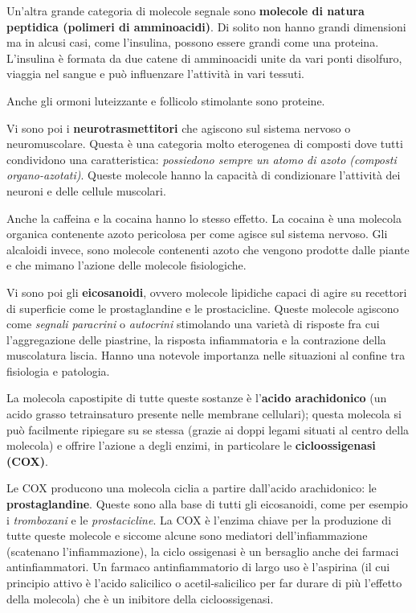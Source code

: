 \documentclass[]{article}
\begin{document}
Un'altra grande categoria di molecole segnale sono \textbf{molecole di
natura peptidica (polimeri di amminoacidi)}. Di solito non hanno grandi
dimensioni ma in alcusi casi, come l'insulina, possono essere grandi
come una proteina. L'insulina è formata da due catene di amminoacidi
unite da vari ponti disolfuro, viaggia nel sangue e può influenzare
l'attività in vari tessuti.

Anche gli ormoni luteizzante e follicolo stimolante sono proteine.

Vi sono poi i \textbf{neurotrasmettitori} che agiscono sul sistema
nervoso o neuromuscolare. Questa è una categoria molto eterogenea di
composti dove tutti condividono una caratteristica: \emph{possiedono
sempre un atomo di azoto (composti organo-azotati)}. Queste molecole
hanno la capacità di condizionare l'attività dei neuroni e delle cellule
muscolari.

Anche la caffeina e la cocaina hanno lo stesso effetto. La cocaina è una
molecola organica contenente azoto pericolosa per come agisce sul
sistema nervoso. Gli alcaloidi invece, sono molecole contenenti azoto
che vengono prodotte dalle piante e che mimano l'azione delle molecole
fisiologiche.

Vi sono poi gli \textbf{eicosanoidi}, ovvero molecole lipidiche capaci
di agire su recettori di superficie come le prostaglandine e le
prostacicline. Queste molecole agiscono come \emph{segnali paracrini} o
\emph{autocrini} stimolando una varietà di risposte fra cui
l'aggregazione delle piastrine, la risposta infiammatoria e la
contrazione della muscolatura liscia. Hanno una notevole importanza
nelle situazioni al confine tra fisiologia e patologia.

La molecola capostipite di tutte queste sostanze è l'\textbf{acido
arachidonico} (un acido grasso tetrainsaturo presente nelle membrane
cellulari); questa molecola si può facilmente ripiegare su se stessa
(grazie ai doppi legami situati al centro della molecola) e offrire
l'azione a degli enzimi, in particolare le \textbf{cicloossigenasi
(COX)}.

Le COX producono una molecola ciclia a partire dall'acido arachidonico:
le \textbf{prostaglandine}. Queste sono alla base di tutti gli
eicosanoidi, come per esempio i \emph{tromboxani} e le
\emph{prostacicline}. La COX è l'enzima chiave per la produzione di
tutte queste molecole e siccome alcune sono mediatori dell'infiammazione
(scatenano l'infiammazione), la ciclo ossigenasi è un bersaglio anche
dei farmaci antinfiammatori. Un farmaco antinfiammatorio di largo uso è
l'aspirina (il cui principio attivo è l'acido salicilico o
acetil-salicilico per far durare di più l'effetto della molecola) che è
un inibitore della cicloossigenasi.
\end{document}
